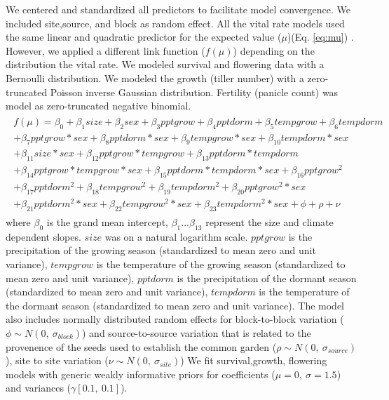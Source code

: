 \documentclass[12pt]{article}
\begin{document}
We centered and standardized all predictors to facilitate model convergence.
We included site,source, and block as random effect.
All the vital rate models used the same linear and quadratic predictor for the expected value ($\mu$)(Eq. \ref{eq:mu}) . 
However, we applied a different link function ($f(\mu)$) depending on the distribution the vital rate. 
We modeled survival and flowering data with a Bernoulli distribution.
We modeled the growth (tiller number) with a zero-truncated Poisson inverse Gaussian distribution. 
Fertility (panicle count) was model as zero-truncated negative binomial. 
\begin{align}\label{eq:mu}
\begin{split}
f(\mu) = \beta_{0} + \beta_{1}size + \beta_{2}sex + \beta_{3}pptgrow + \beta_{4}pptdorm + \beta_{5}tempgrow + \beta_{6}tempdorm \\ 
+ \beta_{7}pptgrow*sex + \beta_{8}pptdorm*sex + \beta_{9}tempgrow*sex + \beta_{10}tempdorm*sex  \\ 
+  \beta_{11}size*sex + \beta_{12}pptgrow*tempgrow + \beta_{13}pptdorm*tempdorm\\
+ \beta_{14}pptgrow*tempgrow*sex + \beta_{15}pptdorm*tempdorm*sex + \beta_{16}pptgrow^2\\
+ \beta_{17}pptdorm^2 + \beta_{18}tempgrow^2 + \beta_{19}tempdorm^2 + \beta_{20}pptgrow^2*sex  \\
+ \beta_{21}pptdorm^2*sex + \beta_{22}tempgrow^2*sex + \beta_{23}tempdorm^2*sex + \phi + \rho + \nu 
\end{split}
\end{align}
\noindent where $\beta_{0}$ is the  grand mean intercept, $\beta_{1}$...$\beta_{13}$ represent the size and climate dependent slopes.
$size$ was on a natural logarithm scale. 
$pptgrow$ is the precipitation of the growing season (standardized to mean zero and unit variance), $tempgrow$ is the temperature of the growing season (standardized to mean zero and unit variance), $pptdorm$ is the precipitation of the dormant season (standardized to mean zero and unit variance), $tempdorm$ is the temperature of the dormant season (standardized to mean zero and unit variance).
The model also includes normally distributed random effects for block-to-block variation ($\phi \sim N(0,\ \sigma_{block})$) and source-to-source variation that is related to the provenence of the seeds used to establish the common garden ($\rho \sim N(0,\ \sigma_{source})$), site to site variation ($\nu \sim N(0,\ \sigma_{site})$)
We fit survival,growth, flowering models with generic weakly informative priors for coefficients ($\mu = 0,\ \sigma = 1.5$) and variances ($\gamma [0.1,\ 0.1]$).
\end{document}
